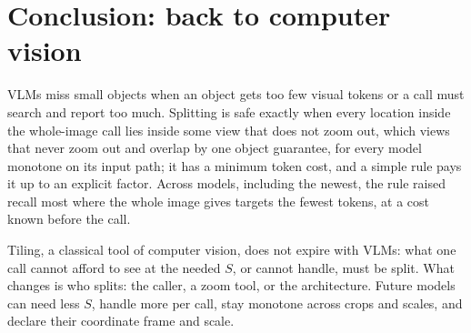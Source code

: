 \section{Conclusion: back to computer vision}
\label{sec:conclusion}

VLMs miss small objects when an object gets too few visual tokens or a call must search and report too much. Splitting is safe exactly when every location inside the whole-image call lies inside some view that does not zoom out, which views that never zoom out and overlap by one object guarantee, for every model monotone on its input path; it has a minimum token cost, and a simple rule pays it up to an explicit factor. Across \CscaleModels{} models, including the newest, the rule raised recall most where the whole image gives targets the fewest tokens, at a cost known before the call.

Tiling, a classical tool of computer vision, does not expire with VLMs: what one call cannot afford to see at the needed $S$, or cannot handle, must be split. What changes is who splits: the caller, a zoom tool, or the architecture. Future models can need less $S$, handle more per call, stay monotone across crops and scales, and declare their coordinate frame and scale.
